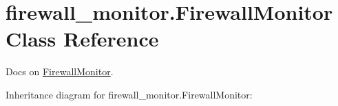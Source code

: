 \hypertarget{classfirewall__monitor_1_1FirewallMonitor}{}\section{firewall\+\_\+monitor.\+Firewall\+Monitor Class Reference}
\label{classfirewall__monitor_1_1FirewallMonitor}


Docs on \hyperlink{classfirewall__monitor_1_1FirewallMonitor}{Firewall\+Monitor}.  




Inheritance diagram for firewall\+\_\+monitor.\+Firewall\+Monitor\+:
